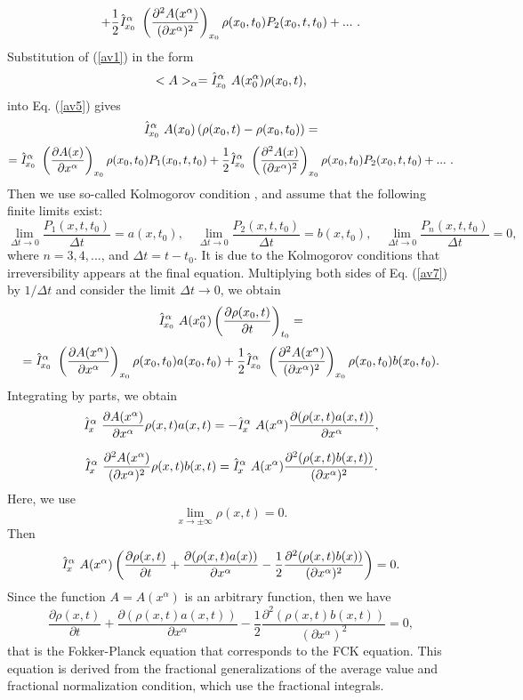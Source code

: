 \documentclass[12pt]{article}
\newcommand{\be}{\begin{equation}}
\newcommand{\ee}{\end{equation}}
\begin{document}
\be \label{av5} +\frac{1}{2} \hat {\it I}^{\alpha}_{x_0}  \
\left(\frac{\partial^2 A(x^{\alpha})}{(\partial x^{\alpha})^2}\right)_{x_0}
\rho(x_0,t_0) P_2(x_0,t,t_0)+... \ .
\ee
Substitution of (\ref{av1}) in the form
\[ <A>_{\alpha}=
\hat {\it I}^{\alpha}_{x_0}  \ A(x^{\alpha}_0) \rho(x_0,t) , \]
into Eq. (\ref{av5}) gives 
\[ \hat {\it I}^{\alpha}_{x_0}  \
A(x_0)\left(\rho(x_0,t)-\rho(x_0,t_0)\right)=  \]
\be \label{av7} 
=\hat {\it I}^{\alpha}_{x_0}  \
\left(\frac{\partial A(x)}{\partial x^{\alpha}}\right)_{x_0} \rho(x_0,t_0)
P_1(x_0,t,t_0)+ \frac{1}{2} \hat {\it I}^{\alpha}_{x_0}  \
\left(\frac{\partial^2 A(x)}{(\partial x^{\alpha})^2}\right)_{x_0}
\rho(x_0,t_0) P_2(x_0,t,t_0)+... \ . \ee
Then we use so-called Kolmogorov condition \cite{Kolm1,Kolm2}, and 
assume that the following finite limits exist:
\[ \lim_{\Delta t \rightarrow 0} \frac{P_1(x,t,t_0)}{\Delta t}= a(x,t_0) , 
\quad
\lim_{\Delta t \rightarrow 0} \frac{P_2(x,t,t_0)}{\Delta t}= b(x,t_0) , 
\quad
\lim_{\Delta t \rightarrow 0} \frac{P_n(x,t,t_0)}{\Delta t}= 0 , 
\]
where $n=3,4,... $, and $\Delta t=t-t_0$.
It is due to the Kolmogorov conditions that irreversibility
appears at the final equation.
Multiplying both sides of Eq. (\ref{av7}) by $1/\Delta t$ and
consider the limit $\Delta t \rightarrow 0$, we obtain
\[ \hat {\it I}^{\alpha}_{x_0}  \ A(x^{\alpha}_0)
\left(\frac{\partial \rho(x_0,t)}{\partial t} \right)_{t_0} = \] 
\[ =\hat {\it I}^{\alpha}_{x_0}  \
\left(\frac{\partial A(x^{\alpha})}{\partial x^{\alpha}}\right)_{x_0} 
\rho(x_0,t_0) a(x_0,t_0) 
+\frac{1}{2} \hat {\it I}^{\alpha}_{x_0}  \
\left(\frac{\partial^2 A(x^{\alpha})}{(\partial x^{\alpha})^2}\right)_{x_0}
\rho(x_0,t_0) b(x_0,t_0) . \]
Integrating by parts, we obtain
\be \label{ip1}
\hat {\it I}^{\alpha}_{x}  \
\frac{\partial A(x^{\alpha})}{\partial x^{\alpha}} \rho(x,t) a(x,t) 
=- \hat {\it I}^{\alpha}_{x}  \ A(x^{\alpha})
\frac{\partial (\rho(x,t) a(x,t))}{\partial x^{\alpha}} , \ee

\be \label{ip2}
\hat {\it I}^{\alpha}_{x}  \
\frac{\partial^2 A(x^{\alpha})}{(\partial x^{\alpha})^2}
\rho(x,t) b(x,t)
=\hat {\it I}^{\alpha}_{x}  \ A(x^{\alpha})
\frac{ \partial^2 (\rho(x,t) b(x,t)) }{ (\partial x^{\alpha})^2 } . \ee
Here, we use
\[ \lim_{x\rightarrow \pm \infty} \rho(x,t)=0 .\]
Then 
\[ \hat {\it I}^{\alpha}_{x}  \ A(x^{\alpha})
\left( \frac{\partial \rho(x,t)}{\partial t}+
\frac{\partial (\rho(x,t)a(x))}{\partial x^{\alpha}}-\frac{1}{2}
\frac{\partial^2 (\rho(x,t)b (x)) }{ (\partial x^{\alpha})^2 }
\right)=0. \]
Since the function $A=A(x^{\alpha})$ is an arbitrary function, then 
we have
\be \label{FP} \frac{\partial \rho(x,t)}{\partial t}+
\frac{\partial (\rho(x,t)a(x,t))}{\partial x^{\alpha}} -\frac{1}{2}
\frac{\partial^2 (\rho(x,t)b (x,t))}{ (\partial x^{\alpha})^2 }=0  , \ee
that is the Fokker-Planck equation that corresponds to
the FCK equation. 
This equation is derived from the fractional generalizations of the
average value and fractional normalization condition, which use 
the fractional integrals. 
\end{document}
